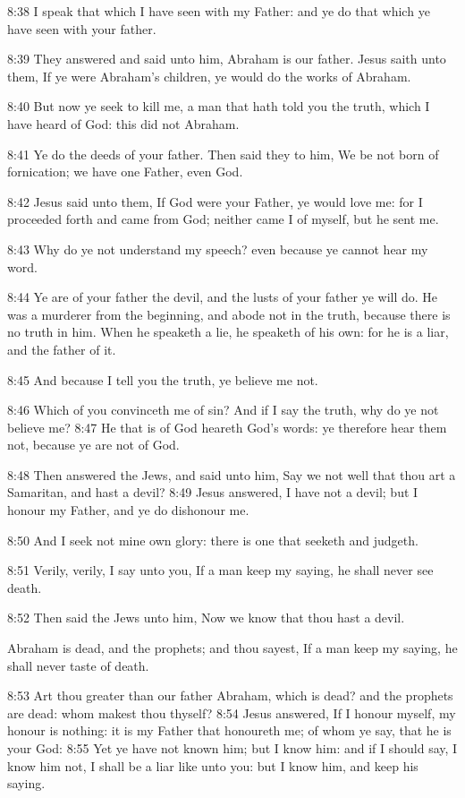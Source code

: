 8:38 I speak that which I have seen with my Father: and ye do that which ye have seen with your father.

8:39 They answered and said unto him, Abraham is our father. Jesus saith unto them, If ye were Abraham's children, ye would do the works of Abraham.

8:40 But now ye seek to kill me, a man that hath told you the truth, which I have heard of God: this did not Abraham.

8:41 Ye do the deeds of your father. Then said they to him, We be not born of fornication; we have one Father, even God.

8:42 Jesus said unto them, If God were your Father, ye would love me: for I proceeded forth and came from God; neither came I of myself, but he sent me.

8:43 Why do ye not understand my speech? even because ye cannot hear my word.

8:44 Ye are of your father the devil, and the lusts of your father ye will do. He was a murderer from the beginning, and abode not in the truth, because there is no truth in him. When he speaketh a lie, he speaketh of his own: for he is a liar, and the father of it.

8:45 And because I tell you the truth, ye believe me not.

8:46 Which of you convinceth me of sin? And if I say the truth, why do ye not believe me?  8:47 He that is of God heareth God's words: ye therefore hear them not, because ye are not of God.

8:48 Then answered the Jews, and said unto him, Say we not well that thou art a Samaritan, and hast a devil?  8:49 Jesus answered, I have not a devil; but I honour my Father, and ye do dishonour me.

8:50 And I seek not mine own glory: there is one that seeketh and judgeth.

8:51 Verily, verily, I say unto you, If a man keep my saying, he shall never see death.

8:52 Then said the Jews unto him, Now we know that thou hast a devil.

Abraham is dead, and the prophets; and thou sayest, If a man keep my saying, he shall never taste of death.

8:53 Art thou greater than our father Abraham, which is dead? and the prophets are dead: whom makest thou thyself?  8:54 Jesus answered, If I honour myself, my honour is nothing: it is my Father that honoureth me; of whom ye say, that he is your God: 8:55 Yet ye have not known him; but I know him: and if I should say, I know him not, I shall be a liar like unto you: but I know him, and keep his saying.

